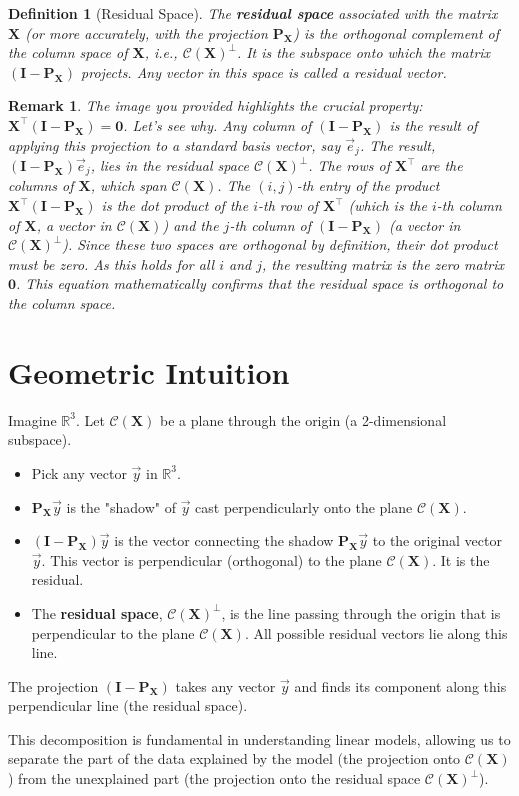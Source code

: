 \documentclass[11pt]{article}
\newcommand{\mat}[1]{\mathbf{#1}} %
\newcommand{\vecspace}[1]{\mathcal{#1}} %
\newcommand{\colspace}[1]{\vecspace{C}(#1)} %
\newcommand{\transpose}[1]{#1^{\top}} %
\newcommand{\proj}[1]{\mat{P}_{#1}} %
\newcommand{\identity}{\mat{I}} %
\newcommand{\realnums}{\mathbb{R}} %
\newtheorem{definition}{Definition}
\newtheorem{remark}{Remark}
\begin{document}
\begin{definition}[Residual Space]
The \textbf{residual space} associated with the matrix $\mat{X}$ (or more accurately, with the projection $\proj{\mat{X}}$) is the orthogonal complement of the column space of $\mat{X}$, i.e., $\colspace{\mat{X}}^{\perp}$. It is the subspace onto which the matrix $(\identity - \proj{\mat{X}})$ projects. Any vector in this space is called a residual vector.
\end{definition}

\begin{remark}
The image you provided highlights the crucial property: $\transpose{\mat{X}}(\identity - \proj{\mat{X}}) = \mat{0}$. Let's see why.
Any column of $(\identity - \proj{\mat{X}})$ is the result of applying this projection to a standard basis vector, say $\vec{e}_j$. The result, $(\identity - \proj{\mat{X}})\vec{e}_j$, lies in the residual space $\colspace{\mat{X}}^{\perp}$.
The rows of $\transpose{\mat{X}}$ are the columns of $\mat{X}$, which span $\colspace{\mat{X}}$.
The $(i, j)$-th entry of the product $\transpose{\mat{X}}(\identity - \proj{\mat{X}})$ is the dot product of the $i$-th row of $\transpose{\mat{X}}$ (which is the $i$-th column of $\mat{X}$, a vector in $\colspace{\mat{X}}$) and the $j$-th column of $(\identity - \proj{\mat{X}})$ (a vector in $\colspace{\mat{X}}^{\perp}$).
Since these two spaces are orthogonal by definition, their dot product must be zero. As this holds for all $i$ and $j$, the resulting matrix is the zero matrix $\mat{0}$. This equation mathematically confirms that the residual space is orthogonal to the column space.
\end{remark}

\section{Geometric Intuition}

Imagine $\realnums^3$. Let $\colspace{\mat{X}}$ be a plane through the origin (a 2-dimensional subspace).
\begin{itemize}
    \item Pick any vector $\vec{y}$ in $\realnums^3$.
    \item $\proj{\mat{X}}\vec{y}$ is the "shadow" of $\vec{y}$ cast perpendicularly onto the plane $\colspace{\mat{X}}$.
    \item $(\identity - \proj{\mat{X}})\vec{y}$ is the vector connecting the shadow $\proj{\mat{X}}\vec{y}$ to the original vector $\vec{y}$. This vector is perpendicular (orthogonal) to the plane $\colspace{\mat{X}}$. It is the residual.
    \item The \textbf{residual space}, $\colspace{\mat{X}}^{\perp}$, is the line passing through the origin that is perpendicular to the plane $\colspace{\mat{X}}$. All possible residual vectors lie along this line.
\end{itemize}
The projection $(\identity - \proj{\mat{X}})$ takes any vector $\vec{y}$ and finds its component along this perpendicular line (the residual space).

This decomposition is fundamental in understanding linear models, allowing us to separate the part of the data explained by the model (the projection onto $\colspace{\mat{X}}$) from the unexplained part (the projection onto the residual space $\colspace{\mat{X}}^{\perp}$).
\end{document}
